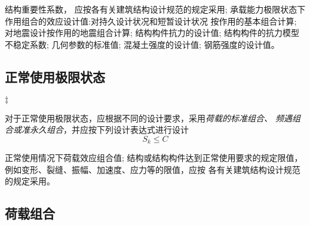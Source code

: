 \begin{descff}
     结构重要性系数，
    应按各有关建筑结构设计规范的规定采用;
     承载能力极限状态下作用组合的效应设计值:对持久设计状况和短暂设计状况%
    按作用的基本组合计算; 对地震设计按作用的地震组合计算;
     结构构件抗力的设计值;
     结构构件的抗力模型不稳定系数;
     几何参数的标准值;
     混凝土强度的设计值;
     钢筋强度的设计值。
\end{descff}

\subsection{正常使用极限状态}

$\ddagger$

对于正常使用极限状态，应根据不同的设计要求，采用{\em 荷载的标准组合、
频遇组合或准永久组合}，并应按下列设计表达式进行设计
\begin{equation}
    S_k \le C
\end{equation}
\begin{descff}
     正常使用情况下荷载效应组合值;
     结构或结构构件达到正常使用要求的规定限值，
    例如变形、裂缝、振幅、加速度、应力等的限值，应按
    各有关建筑结构设计规范的规定采用。
\end{descff}

\subsection{荷载组合}

